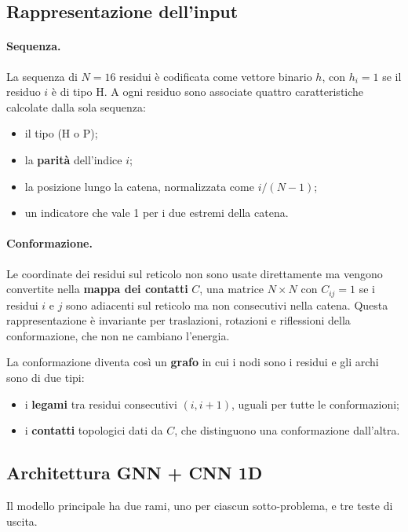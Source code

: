 \documentclass[11pt,a4paper]{article}
\begin{document}
\subsection{Rappresentazione dell'input}
\label{sec:input}

\paragraph{Sequenza.} La sequenza di $N = 16$ residui è codificata come vettore binario $h$, con $h_i = 1$ se il residuo $i$ è di tipo H. A ogni residuo sono associate quattro caratteristiche calcolate dalla sola sequenza:
\begin{itemize}
  \item il tipo (H o P);
  \item la \textbf{parità} dell'indice $i$;
  \item la posizione lungo la catena, normalizzata come $i / (N - 1)$;
  \item un indicatore che vale 1 per i due estremi della catena.
\end{itemize}

\paragraph{Conformazione.} Le coordinate dei residui sul reticolo non sono usate direttamente ma vengono convertite nella \textbf{mappa dei contatti} $C$, una matrice $N \times N$ con $C_{ij} = 1$ se i residui $i$ e $j$ sono adiacenti sul reticolo ma non consecutivi nella catena. Questa rappresentazione è invariante per traslazioni, rotazioni e riflessioni della conformazione, che non ne cambiano l'energia.

La conformazione diventa così un \textbf{grafo} in cui i nodi sono i residui e gli archi sono di due tipi:
\begin{itemize}
  \item i \textbf{legami} tra residui consecutivi $(i, i + 1)$, uguali per tutte le conformazioni;
  \item i \textbf{contatti} topologici dati da $C$, che distinguono una conformazione dall'altra.
\end{itemize}

\subsection{Architettura GNN + CNN 1D}
\label{sec:architettura}

Il modello principale ha due rami, uno per ciascun sotto-problema, e tre teste di uscita.
\end{document}
